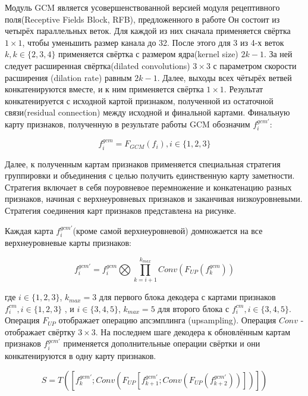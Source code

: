 Модуль GCM является усовершенствованной версией модуля рецептивного поля(Receptive Fields Block, RFB), предложенного в работе \cite{RFB}
Он состоит из четырёх параллельных веток. Для каждой из них сначала применяется свёртка $1 \times 1$, чтобы уменьшить размер
канала до 32. После этого для 3 из 4-х веток $k, k \in \{2,3,4\}$ применяется свёртка с размером ядра(kernel size) $2k-1$. За ней
следует расширенная свёртка(dilated convolutions) $3 \times 3$ с параметром скорости расширения (dilation rate) равным $2k-1$.
Далее, выходы всех чётырёх ветвей конкатенируются вместе, и к ним применяется свёртка $1 \times 1$.
Результат конкатенируется с исходной картой признаком, полученной из остаточной связи(residual connection) между исходной и финальной картами.
Финальную карту признаков, полученную в результате работы GCM обозначим $f_i^{gcm'}$:

\begin{equation}
    f_i^{gcm} = F_{GCM}(f_i), i \in \{1,2,3\}
\end{equation}

Далее, к полученным картам признаков применяется специальная стратегия группировки и объединения с целью получить единственную
карту заметности. Стратегия включает в себя  поуровневое перемножение и конкатенацию разных признаков, начиная с верхнеуровневых признаков
и заканчивая низкоуровневыми. Стратегия соединения карт признаков представлена на рисунке.

Каждая карта $f_i^{gcm'}$(кроме самой верхнеуровневой) домножается на все верхнеуровневые карты признаков:

\begin{equation}
    f_i^{gcm'} = f_i^{gcm} \bigotimes \prod_{k=i+1}^{k_{max}}Conv(F_{UP}(f_k^{gcm}))
\end{equation}

где $i \in \{1,2,3\}$, $k_{max}=3$ для первого блока декодера с картами признаков $f_i^{cm}, i \in \{1,2,3\}$ , и
$i \in \{3,4,5\}$, $k_{max}=5$ для второго блока с $f_i^{cm}, i \in \{3,4,5\}$. Операция $F_{UP}$ отображает
операцию апсэмплинга (upsampling). Операция $Conv$ - отображает свёртку $3 \times 3$.
На последнем шаге декодера к обновлённым картам признаков $f_i^{gcm'}$  применяется дополнительные операции свёртки и они конкатенируются
в одну карту признаков.

\begin{equation}
    S = T([f_k^{gcm'}; Conv(F_{UP}[f_{k+1}^{gcm'}; Conv(F_{UP}(f_{k+2}^{gcm'}))])])
\end{equation}

